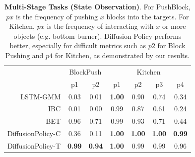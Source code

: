 \documentclass[Afour,sageh,times]{sagej}
\begin{document}
\begin{table}[t]
\setlength\tabcolsep{4.8 pt}
\begin{tabular}{r|cc|cccc}
\toprule
 & \multicolumn{2}{c|}{BlockPush} & \multicolumn{4}{c}{Kitchen} \\
 & p1 & p2 & p1 & p2 & p3 & p4 \\
\midrule
LSTM-GMM & \small 0.03 & \small 0.01 & \small \textbf{1.00} & \small 0.90 & \small 0.74 & \small 0.34 \\
IBC & \small 0.01 & \small 0.00 & \small 0.99 & \small 0.87 & \small 0.61 & \small 0.24 \\
BET & \small 0.96 & \small 0.71 & \small 0.99 & \small 0.93 & \small 0.71 & \small 0.44 \\
DiffusionPolicy-C & \small 0.36 & \small 0.11 & \small \textbf{1.00} & \small \textbf{1.00} & \small \textbf{1.00} & \small \textbf{0.99} \\
DiffusionPolicy-T & \small \textbf{0.99} & \small \textbf{0.94} & \small \textbf{1.00} & \small 0.99 & \small 0.99 & \small 0.96 \\
\bottomrule
\end{tabular}
\caption{\textbf{Multi-Stage Tasks (State Observation)}. 
\label{tab:multi_stage}
For PushBlock, $px$ is the frequency of pushing $x$ blocks into the targets. 
For Kitchen, $px$ is the frequency of interacting with $x$ or more objects (e.g. bottom burner). 
Diffusion Policy performs better, especially for difficult metrics such as $p2$ for Block Pushing and $p4$ for Kitchen, as demonstrated by our results.
}
\vspace{-4mm}
\end{table}
\end{document}
